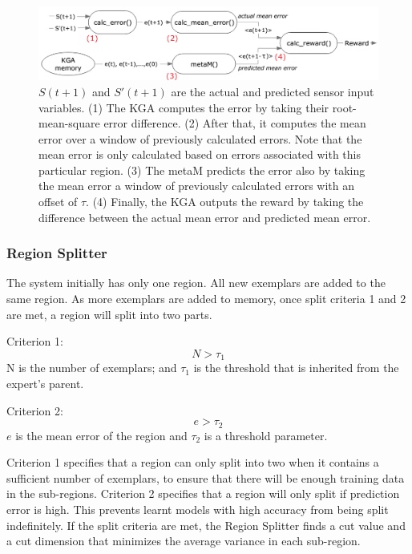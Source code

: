\begin{figure}[htb]
	\centering
	\includegraphics[width=1.0 \textwidth]{"fig/cbla/Block Diagram KGA"}
	\caption[Block diagram of the Knowledge Gain Assessor]{$S(t+1)$ and $S'(t+1)$ are the actual and predicted sensor input variables. (1) The KGA computes the error by taking their root-mean-square error difference. (2) After that, it computes the mean error over a window of previously calculated errors. Note that the mean error is only calculated based on errors associated with this particular region. (3) The metaM predicts the error also by taking the mean error a window of previously calculated errors with an offset of $\tau$. (4) Finally, the KGA outputs the reward by taking the difference between the actual mean error and predicted mean error. }
	\label{fig:Block Diagram KGA}
\end{figure}

\FloatBarrier
\subsubsection{Region Splitter}

The system initially has only one region. All new exemplars are added to the same region. As more exemplars are added to memory, once split criteria 1 and 2 are met, a region will split into two parts.

Criterion 1: 
\begin{equation}\label{eqn:split-criterion1}
	N>\tau_1
\end{equation}
N is the number of exemplars; and $\tau_1$ is the threshold that is inherited from the expert's parent. 

Criterion 2:	
\begin{equation}\label{eqn:split-criterion2}
	 e>\tau_2
\end{equation}	
$e$ is the mean error of the region and $\tau_2$ is a threshold parameter. 

Criterion 1 specifies that a region can only split into two when it contains a sufficient number of exemplars, to ensure that there will be enough training data in the sub-regions. Criterion 2 specifies that a region will only split if prediction error is high. This prevents learnt models with high accuracy from being split indefinitely. 
If the split criteria are met, the Region Splitter finds a cut value and a cut dimension that minimizes the average variance in each sub-region. 

